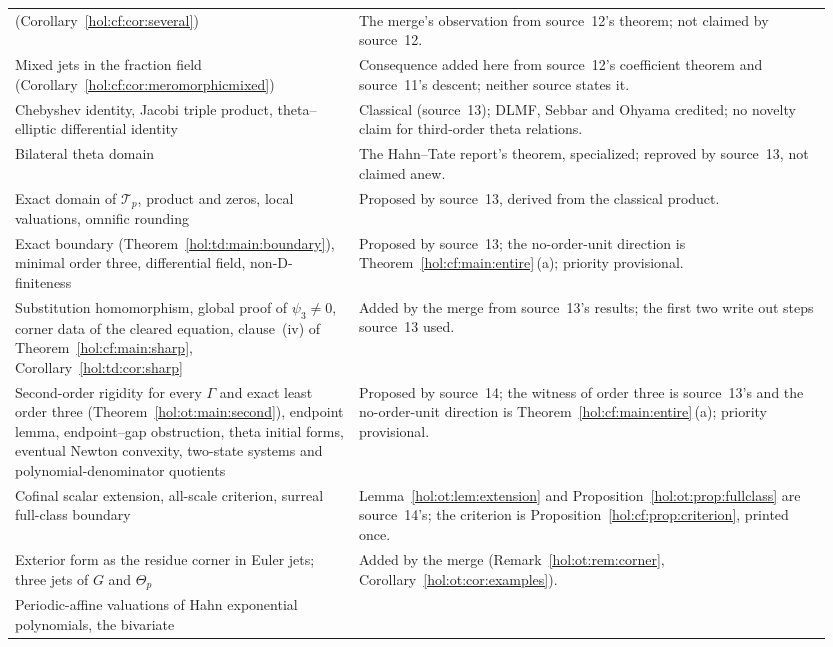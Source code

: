 \documentclass[11pt]{article}
\numberwithin{equation}{section}
\theoremstyle{definition}
\theoremstyle{remark}
\begin{document}
\begin{longtable}{@{}>{\raggedright\arraybackslash}p{0.40\linewidth}
                    >{\raggedright\arraybackslash}p{0.55\linewidth}@{}}
(Corollary~\ref{hol:cf:cor:several}) & The merge's observation from
source~12's theorem; not claimed by source~12.\\[4pt]
Mixed jets in the fraction field
(Corollary~\ref{hol:cf:cor:meromorphicmixed}) &
Consequence added here from source~12's coefficient theorem and source~11's
descent; neither source states it.\\[4pt]
Chebyshev identity, Jacobi triple product, theta--elliptic differential
identity & Classical (source~13); DLMF, Sebbar and Ohyama credited; no
novelty claim for third-order theta relations.\\[4pt]
Bilateral theta domain & The Hahn--Tate report's theorem, specialized;
reproved by source~13, not claimed anew.\\[4pt]
Exact domain of $\mathcal T_p$, product and zeros, local valuations,
omnific rounding & Proposed by source~13, derived from the classical
product.\\[4pt]
Exact boundary (Theorem~\ref{hol:td:main:boundary}), minimal order three,
differential field, non-D-finiteness & Proposed by source~13; the
no-order-unit direction is Theorem~\ref{hol:cf:main:entire}\,(a); priority
provisional.\\[4pt]
Substitution homomorphism, global proof of $\psi_3\ne0$, corner data of the
cleared equation, clause~(iv) of Theorem~\ref{hol:cf:main:sharp},
Corollary~\ref{hol:td:cor:sharp} & Added by the merge from source~13's
results; the first two write out steps source~13 used.\\[4pt]
Second-order rigidity for every $\Gamma$ and exact least order three
(Theorem~\ref{hol:ot:main:second}), endpoint lemma, endpoint--gap
obstruction, theta initial forms, eventual Newton convexity, two-state systems
and polynomial-denominator quotients & Proposed by source~14; the witness of
order three is source~13's and the no-order-unit direction is
Theorem~\ref{hol:cf:main:entire}\,(a); priority provisional.\\[4pt]
Cofinal scalar extension, all-scale criterion, surreal full-class boundary &
Lemma~\ref{hol:ot:lem:extension} and
Proposition~\ref{hol:ot:prop:fullclass} are source~14's; the criterion is
Proposition~\ref{hol:cf:prop:criterion}, printed once.\\[4pt]
Exterior form as the residue corner in Euler jets; three jets of $G$ and
$\Theta_p$ & Added by the merge (Remark~\ref{hol:ot:rem:corner},
Corollary~\ref{hol:ot:cor:examples}).\\[4pt]
Periodic-affine valuations of Hahn exponential polynomials, the bivariate

\end{longtable}
\end{document}
